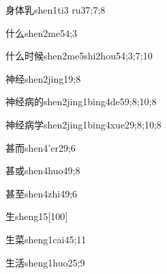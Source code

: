 \begin{verbete}{身体乳}{shen1ti3 ru3}{7;7;8}
\end{verbete}

\begin{verbete}{什么}{shen2me5}{4;3}
\end{verbete}

\begin{verbete}{什么时候}{shen2me5shi2hou5}{4;3;7;10}
\end{verbete}

\begin{verbete}{神经}{shen2jing1}{9;8}
\end{verbete}

\begin{verbete}{神经病的}{shen2jing1bing4de5}{9;8;10;8}
\end{verbete}

\begin{verbete}{神经病学}{shen2jing1bing4xue2}{9;8;10;8}
\end{verbete}

\begin{verbete}{甚而}{shen4'er2}{9;6}
\end{verbete}

\begin{verbete}{甚或}{shen4huo4}{9;8}
\end{verbete}

\begin{verbete}{甚至}{shen4zhi4}{9;6}
\end{verbete}

\begin{verbete}{生}{sheng1}{5}[100]
\end{verbete}

\begin{verbete}{生菜}{sheng1cai4}{5;11}
\end{verbete}

\begin{verbete}{生活}{sheng1huo2}{5;9}
\end{verbete}

